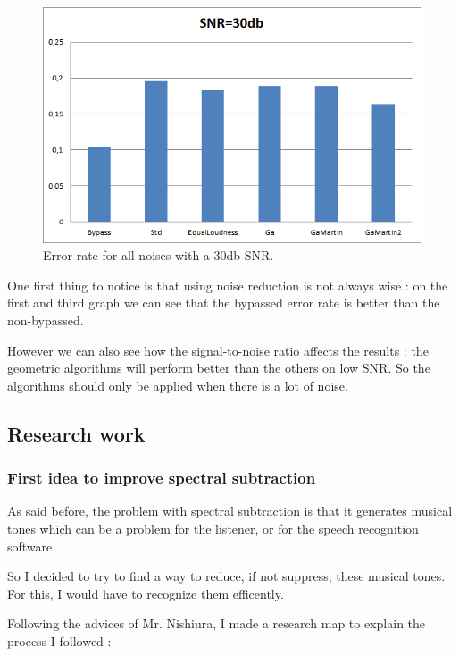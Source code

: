 \begin{figure}[H]
\begin{center}
\includegraphics[scale=0.7]{images/snr30.png}
\caption{Error rate for all noises with a 30db SNR.}
\end{center}
\end{figure}

One first thing to notice is that using noise reduction is not always wise : on the first and third graph we can see that the bypassed error rate is better than the non-bypassed. 

However we can also see how the signal-to-noise ratio affects the results : the geometric algorithms will perform better than the others on low SNR. So the algorithms should only be applied when there is a lot of noise.
\subsection{Research work}
\subsubsection{First idea to improve spectral subtraction}
As said before, the problem with spectral subtraction is that it generates musical tones which can be a problem for the listener, or for the speech recognition software.

So I decided to try to find a way to reduce, if not suppress, these musical tones.
For this, I would have to recognize them efficently.

Following the advices of Mr. Nishiura, I made a research map to explain the process I followed : 

